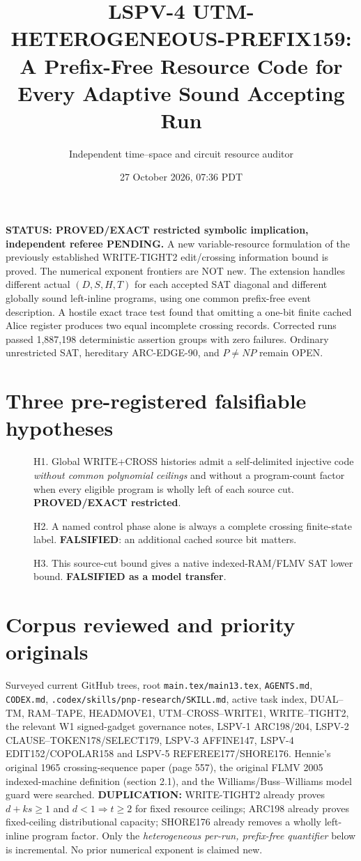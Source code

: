 \documentclass[11pt]{article}
\title{LSPV-4 UTM-HETEROGENEOUS-PREFIX159:\\
A Prefix-Free Resource Code for Every Adaptive Sound Accepting Run}
\author{Independent time--space and circuit resource auditor}
\date{27 October 2026, 07:36 PDT}
\begin{document}
\maketitle

\noindent\textbf{STATUS: PROVED/EXACT restricted symbolic implication,
independent referee PENDING.} A new variable-resource formulation of
the previously established WRITE-TIGHT2 edit/crossing information bound
is proved. The numerical exponent frontiers are NOT new. The extension
handles different actual $(D,S,H,T)$ for each accepted SAT diagonal
and different globally sound left-inline programs, using one common
prefix-free event description. A hostile exact trace test found that
omitting a one-bit finite cached Alice register produces two equal
incomplete crossing records. Corrected runs passed 1,887,198
deterministic assertion groups with zero failures. Ordinary unrestricted
SAT, hereditary ARC-EDGE-90, and $P\ne NP$ remain OPEN.

\section{Three pre-registered falsifiable hypotheses}
\begin{description}
\item[] H1. Global WRITE+CROSS histories admit a self-delimited
injective code \emph{without common polynomial ceilings} and
without a program-count factor when every eligible program is
wholly left of each source cut. \textbf{PROVED/EXACT restricted}.
\item[] H2. A named control phase alone is always a complete
crossing finite-state label. \textbf{FALSIFIED}: an additional
cached source bit matters.
\item[] H3. This source-cut bound gives a native indexed-RAM/FLMV
SAT lower bound. \textbf{FALSIFIED as a model transfer}.
\end{description}

\section{Corpus reviewed and priority originals}
Surveyed current GitHub trees, root \texttt{main.tex/main13.tex},
\texttt{AGENTS.md}, \texttt{CODEX.md},
\texttt{.codex/skills/pnp-research/SKILL.md}, active task index,
DUAL--TM, RAM--TAPE, HEADMOVE1, UTM--CROSS--WRITE1,
WRITE--TIGHT2, the relevant W1 signed-gadget governance notes,
LSPV-1 ARC198/204, LSPV-2 CLAUSE--TOKEN178/SELECT179,
LSPV-3 AFFINE147, LSPV-4 EDIT152/COPOLAR158 and LSPV-5
REFEREE177/SHORE176.
Hennie's original 1965 crossing-sequence paper (page 557),
the original FLMV 2005 indexed-machine definition (section 2.1),
and the Williams/Buss--Williams model guard were searched.
\textbf{DUPLICATION:} WRITE-TIGHT2 already proves $d+ks\ge1$
and $d<1\Rightarrow t\ge2$ for fixed resource ceilings;
ARC198 already proves fixed-ceiling distributional capacity;
SHORE176 already removes a wholly left-inline program factor.
Only the \emph{heterogeneous per-run, prefix-free quantifier}
below is incremental. No prior numerical exponent is claimed new.
\end{document}
